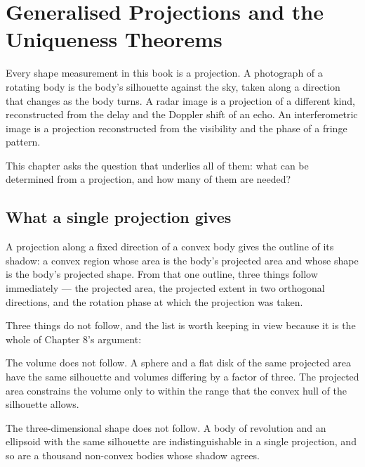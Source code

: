 
\chapter{Generalised Projections and the Uniqueness Theorems}
\label{ch:projections}

Every shape measurement in this book is a projection. A photograph of a
rotating body is the body's silhouette against the sky, taken along a
direction that changes as the body turns. A radar image is a projection of a
different kind, reconstructed from the delay and the Doppler shift of an
echo. An interferometric image is a projection reconstructed from the
visibility and the phase of a fringe pattern.

This chapter asks the question that underlies all of them: what can be
determined from a projection, and how many of them are needed?

\section{What a single projection gives}

A projection along a fixed direction of a convex body gives the outline of
its shadow: a convex region whose area is the body's projected area and
whose shape is the body's projected shape. From that one outline, three
things follow immediately --- the projected area, the projected extent in
two orthogonal directions, and the rotation phase at which the projection
was taken.

Three things do not follow, and the list is worth keeping in view because it
is the whole of Chapter 8's argument:

The volume does not follow. A sphere and a flat disk of the same projected
area have the same silhouette and volumes differing by a factor of three.
The projected area constrains the volume only to within the range that the
convex hull of the silhouette allows.

The three-dimensional shape does not follow. A body of revolution and an
ellipsoid with the same silhouette are indistinguishable in a single
projection, and so are a thousand non-convex bodies whose shadow agrees.

